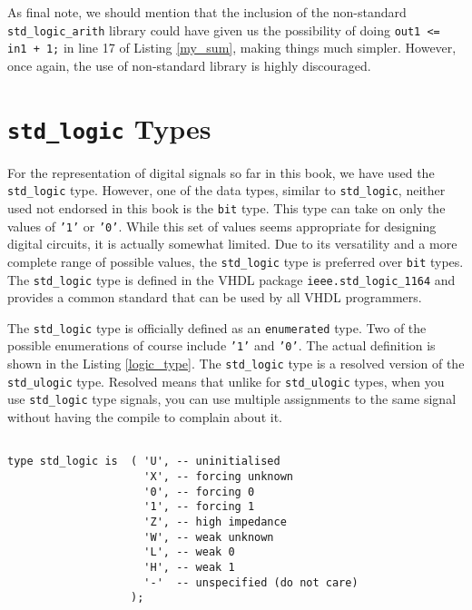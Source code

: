 As final note, we should mention that the inclusion of the non-standard \texttt{std\_logic\_arith} library could have given us the possibility of doing \texttt{out1 <= in1 + 1;} in line 17 of Listing \ref{my_sum}, making things much simpler. However, once again, the use of non-standard library is highly discouraged.

\section{\texttt{std\_logic} Types}
For the representation of digital signals so far in this book, we have used the \texttt{std\_logic} type. However, one of the data types, similar to \texttt{std\_logic}, neither used not endorsed in this book is the \texttt{bit} type. This type can take on only the values of \texttt{'1'} or \texttt{'0'}. While this set of values seems appropriate for designing digital circuits, it is actually somewhat limited. Due to its versatility and a more complete range of possible values, the \texttt{std\_logic} type is preferred over \texttt{bit} types. The \texttt{std\_logic} type is defined in the VHDL package \texttt{ieee.std\_logic\_1164} and provides a common standard that can be used by all VHDL programmers.

The \texttt{std\_logic} type is officially defined as an \texttt{enumerated} type. Two of the possible enumerations of course include \texttt{'1'} and \texttt{'0'}. The actual definition is shown in the Listing \ref{logic_type}. The \texttt{std\_logic} type is a resolved version of the \texttt{std\_ulogic} type. Resolved means that unlike for \texttt{std\_ulogic} types, when you use \texttt{std\_logic} type signals, you can use multiple assignments to the same signal without having the compile to complain about it.

\noindent
\begin{minipage}{0.99\linewidth}
\begin{lstlisting}[label=logic_type, caption=Declaration of the \texttt{std\_logic} enumerated type.]

type std_logic is  ( 'U', -- uninitialised 
                     'X', -- forcing unknown
                     '0', -- forcing 0
                     '1', -- forcing 1
                     'Z', -- high impedance
                     'W', -- weak unknown
                     'L', -- weak 0
                     'H', -- weak 1
                     '-'  -- unspecified (do not care) 
                   );
\end{lstlisting}
\end{minipage}

